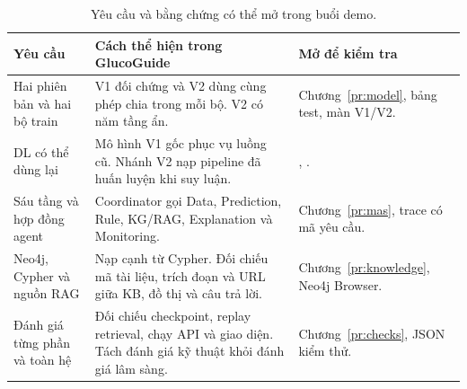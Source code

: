 \par\FloatBarrier\begin{table}[H]\centering\small{}\setlength{\tabcolsep}{5pt}
\caption{Yêu cầu và bằng chứng có thể mở trong buổi demo.}\begin{tabular}{P{3.7cm}P{6.0cm}P{4.1cm}}\toprule
Yêu cầu & Cách thể hiện trong GlucoGuide & Mở để kiểm tra\\\midrule
Hai phiên bản và hai bộ train & V1 đối chứng và V2 dùng cùng phép chia trong mỗi bộ. V2 có năm tầng ẩn. & Chương~\ref{pr:model}, bảng test, màn V1/V2.\\
DL có thể dùng lại & Mô hình V1 gốc phục vụ luồng cũ. Nhánh V2 nạp pipeline đã huấn luyện khi suy luận. & , .\\
Sáu tầng và hợp đồng agent & Coordinator gọi Data, Prediction, Rule, KG/RAG, Explanation và Monitoring. & Chương~\ref{pr:mas}, trace có mã yêu cầu.\\
Neo4j, Cypher và nguồn RAG & Nạp cạnh từ Cypher. Đối chiếu mã tài liệu, trích đoạn và URL giữa KB, đồ thị và câu trả lời. & Chương~\ref{pr:knowledge}, Neo4j Browser.\\
Đánh giá từng phần và toàn hệ & Đối chiếu checkpoint, replay retrieval, chạy API và giao diện. Tách đánh giá kỹ thuật khỏi đánh giá lâm sàng. & Chương~\ref{pr:checks}, JSON kiểm thử.\\\bottomrule\end{tabular}\end{table}
